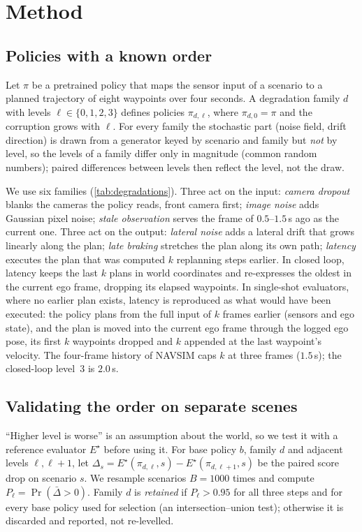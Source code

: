 \section{Method}
\label{sec:method}

\subsection{Policies with a known order}
\label{sec:method:popA}
Let $\pi$ be a pretrained policy that maps the sensor input of a scenario to a planned trajectory
of eight waypoints over four seconds.
A degradation family $d$ with levels $\ell\in\{0,1,2,3\}$ defines policies $\pi_{d,\ell}$, where
$\pi_{d,0}=\pi$ and the corruption grows with $\ell$.
For every family the stochastic part (noise field, drift direction) is drawn from a generator keyed
by scenario and family but \emph{not} by level, so the levels of a family differ only in magnitude
(common random numbers); paired differences between levels then reflect the level, not the draw.

We use six families (\cref{tab:degradations}).
Three act on the input: \emph{camera dropout} blanks the cameras the policy reads, front camera first;
\emph{image noise} adds Gaussian pixel noise; \emph{stale observation} serves the frame of
$0.5$--$1.5$\,s ago as the current one.
Three act on the output: \emph{lateral noise} adds a lateral drift that grows linearly along the
plan; \emph{late braking} stretches the plan along its own path; \emph{latency} executes the plan
that was computed $k$ replanning steps earlier.
In closed loop, latency keeps the last $k$ plans in world coordinates and re-expresses the oldest in
the current ego frame, dropping its elapsed waypoints.
In single-shot evaluators, where no earlier plan exists, latency is reproduced as what would have been
executed: the policy plans from the full input of $k$ frames earlier (sensors and ego state), and the
plan is moved into the current ego frame through the logged ego pose, its first $k$ waypoints dropped
and $k$ appended at the last waypoint's velocity.
The four-frame history of NAVSIM caps $k$ at three frames ($1.5$\,s); the closed-loop level~3 is
$2.0$\,s.

\subsection{Validating the order on separate scenes}
\label{sec:method:mono}
``Higher level is worse'' is an assumption about the world, so we test it with a reference evaluator
$E^\star$ before using it.
For base policy $b$, family $d$ and adjacent levels $\ell,\ell+1$, let
$\Delta_s = E^\star(\pi_{d,\ell},s) - E^\star(\pi_{d,\ell+1},s)$ be the paired score drop on scenario
$s$.
We resample scenarios $B=1000$ times and compute $P_{\ell} = \Pr(\bar\Delta > 0)$.
Family $d$ is \emph{retained} if $P_\ell > 0.95$ for all three steps and for every base policy used
for selection (an intersection--union test); otherwise it is discarded and reported, not re-levelled.

